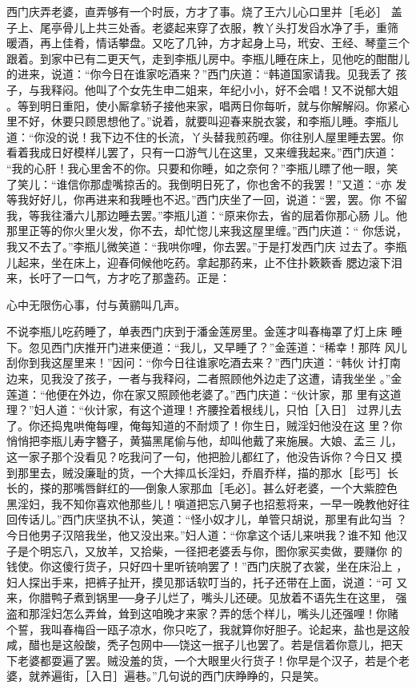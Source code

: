 西门庆弄老婆，直弄够有一个时辰，方才了事。烧了王六儿心口里并［毛必］
盖子上、尾亭骨儿上共三处香。老婆起来穿了衣服，教丫头打发舀水净了手，重筛
暖酒，再上佳肴，情话攀盘。又吃了几钟，方才起身上马，玳安、王经、琴童三个
跟着。到家中已有二更天气，走到李瓶儿房中。李瓶儿睡在床上，见他吃的酣酣儿
的进来，说道：“你今日在谁家吃酒来？”西门庆道：“韩道国家请我。见我丢了
孩子，与我释闷。他叫了个女先生申二姐来，年纪小小，好不会唱！又不说郁大姐
。等到明日重阳，使小厮拿轿子接他来家，唱两日你每听，就与你解解闷。你紧心
里不好，休要只顾思想他了。”说着，就要叫迎春来脱衣裳，和李瓶儿睡。李瓶儿
道：“你没的说！我下边不住的长流，丫头替我煎药哩。你往别人屋里睡去罢。你
看着我成日好模样儿罢了，只有一口游气儿在这里，又来缠我起来。”西门庆道：
“我的心肝！我心里舍不的你。只要和你睡，如之奈何？”李瓶儿瞟了他一眼，笑
了笑儿：“谁信你那虚嘴掠舌的。我倒明日死了，你也舍不的我罢！”又道：“亦
发等我好好儿，你再进来和我睡也不迟。”西门庆坐了一回，说道：“罢，罢。你
不留我，等我往潘六儿那边睡去罢。”李瓶儿道：“原来你去，省的屈着你那心肠
儿。他那里正等的你火里火发，你不去，却忙惚儿来我这屋里缠。”西门庆道：“
你恁说，我又不去了。”李瓶儿微笑道：“我哄你哩，你去罢。”于是打发西门庆
过去了。李瓶儿起来，坐在床上，迎春伺候他吃药。拿起那药来，止不住扑簌簌香
腮边滚下泪来，长吁了一口气，方才吃了那盏药。正是：

心中无限伤心事，付与黄鹂叫几声。

不说李瓶儿吃药睡了，单表西门庆到于潘金莲房里。金莲才叫春梅罩了灯上床
睡下。忽见西门庆推开门进来便道：“我儿，又早睡了？”金莲道：“稀幸！那阵
风儿刮你到我这屋里来！”因问：“你今日往谁家吃酒去来？”西门庆道：“韩伙
计打南边来，见我没了孩子，一者与我释闷，二者照顾他外边走了这遭，请我坐坐
。”金莲道：“他便在外边，你在家又照顾他老婆了。”西门庆道：“伙计家，那
里有这道理？”妇人道：“伙计家，有这个道理！齐腰拴着根线儿，只怕［入日］
过界儿去了。你还捣鬼哄俺每哩，俺每知道的不耐烦了！你生日，贼淫妇他没在这
里？你悄悄把李瓶儿寿字簪子，黄猫黑尾偷与他，却叫他戴了来施展。大娘、孟三
儿，这一家子那个没看见？吃我问了一句，他把脸儿都红了，他没告诉你？今日又
摸到那里去，贼没廉耻的货，一个大摔瓜长淫妇，乔眉乔样，描的那水［髟丐］长
长的，搽的那嘴唇鲜红的──倒象人家那血［毛必］。甚么好老婆，一个大紫腔色
黑淫妇，我不知你喜欢他那些儿！嗔道把忘八舅子也招惹将来，一早一晚教他好往
回传话儿。”西门庆坚执不认，笑道：“怪小奴才儿，单管只胡说，那里有此勾当
？今日他男子汉陪我坐，他又没出来。”妇人道：“你拿这个话儿来哄我？谁不知
他汉子是个明忘八，又放羊，又拾柴，一径把老婆丢与你，图你家买卖做，要赚你
的钱使。你这傻行货子，只好四十里听铳响罢了！”西门庆脱了衣裳，坐在床沿上
，妇人探出手来，把裤子扯开，摸见那话软叮当的，托子还带在上面，说道：“可
又来，你腊鸭子煮到锅里──身子儿烂了，嘴头儿还硬。见放着不语先生在这里，
强盗和那淫妇怎么弄耸，耸到这咱晚才来家？弄的恁个样儿，嘴头儿还强哩！你赌
个誓，我叫春梅舀一瓯子凉水，你只吃了，我就算你好胆子。论起来，盐也是这般
咸，醋也是这般酸，秃子包网中──饶这一抿子儿也罢了。若是信着你意儿，把天
下老婆都耍遍了罢。贼没羞的货，一个大眼里火行货子！你早是个汉子，若是个老
婆，就养遍街，［入日］遍巷。”几句说的西门庆睁睁的，只是笑。

